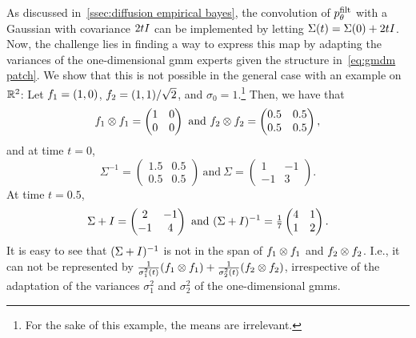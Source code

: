 As discussed in~\cref{ssec:diffusion empirical bayes}, the convolution of \( p^{\mathrm{filt}}_\theta \) with a Gaussian with covariance \( \num{2}tI \) can be implemented by letting \( \Sigma(t) = \Sigma(\num{0}) + \num{2}tI \).
Now, the challenge lies in finding a way to express this map by adapting the variances of the one-dimensional \gls{gmm} experts given the structure in~\cref{eq:gmdm patch}.
We show that this is not possible in the general case with an example on \( \mathbb{R}^{\num{2}} \):
Let \( f_{\num{1}} = (\num{1}, \num{0}) \), \( f_{\num{2}} = (\num{1}, \num{1}) / \sqrt{\num{2}} \), and \( \sigma_{\num{0}} = \num{1} \).\footnote{%
	For the sake of this example, the means are irrelevant.
}
Then, we have that
\begin{equation}
	f_{\num{1}} \otimes f_{\num{1}} = \begin{pmatrix}
		\num{1} & \num{0} \\
		\num{0} & \num{0}
		\end{pmatrix}\ \text{and}\ f_{\num{2}} \otimes f_{\num{2}} = \begin{pmatrix}
		\num{0.5} & \num{0.5} \\
		\num{0.5} & \num{0.5}
	\end{pmatrix},
\end{equation}
and at time \( t = \num{0} \),
\begin{equation}
	\Sigma^{-1} = \begin{pmatrix}
		\num{1.5} & \num{0.5} \\
		\num{0.5} & \num{0.5}
	\end{pmatrix}\ \text{and}\ \Sigma = \begin{pmatrix}
		\num{1} & \num{-1} \\
		\num{-1} & \num{3}
	\end{pmatrix}.
\end{equation}
At time \( t = \num{0.5} \),
\begin{equation}
	\Sigma + I = \begin{pmatrix}
		\num{2} & \num{-1} \\
		\num{-1} & \num{4}
	\end{pmatrix}\ \text{and}\ (\Sigma + I)^{\num{-1}} = \tfrac{1}{7} \begin{pmatrix}
		\num{4} & \num{1} \\
		\num{1} & \num{2}
	\end{pmatrix}.
\end{equation}
It is easy to see that \( (\Sigma + I)^{-1} \) is not in the span of \( f_{\num{1}} \otimes f_{\num{1}} \) and \( f_{\num{2}} \otimes f_{\num{2}} \).
I.e., it can not be represented by \( \frac{1}{\sigma_{\num{1}}^{\num{2}}(t)} (f_{\num{1}} \otimes f_{\num{1}}) + \frac{1}{\sigma_{\num{2}}^{\num{2}}(t)} (f_{\num{2}} \otimes f_{\num{2}}) \), irrespective of the adaptation of the variances \( \sigma_{\num{1}}^{\num{2}} \) and \( \sigma_{\num{2}}^{\num{2}} \) of the one-dimensional \glspl{gmm}.

